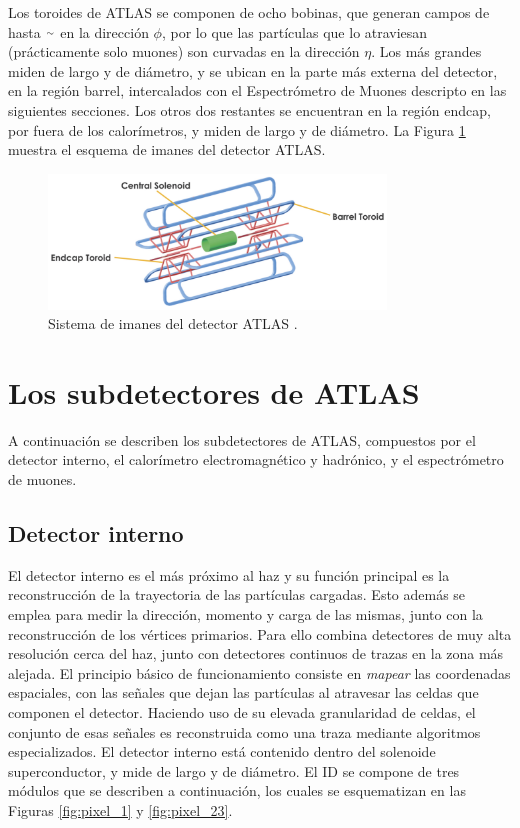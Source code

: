 Los toroides de ATLAS se componen de ocho bobinas, que generan campos de hasta {$\smallsim$} en la dirección $\phi$, por lo que las partículas que lo atraviesan (prácticamente solo muones) son curvadas en la dirección $\eta$. Los más grandes miden  de largo y  de diámetro, y se ubican en la parte más externa del detector, en la región barrel, intercalados con el Espectrómetro de Muones descripto en las siguientes secciones. Los otros dos restantes se encuentran en la región endcap, por fuera de los calorímetros, y miden  de largo y  de diámetro. La Figura \ref{fig:magnet_1} muestra el esquema de imanes del detector ATLAS.

\begin{figure}
\centering
  \includegraphics[width=0.8\textwidth]{images/lhc/magnet_1.png}
  \caption{Sistema de imanes del detector ATLAS \cite{magnet_system}.}
  \label{fig:magnet_1}
\end{figure}


\section{Los subdetectores de ATLAS}

A continuación se describen los subdetectores de ATLAS, compuestos por el detector interno, el calorímetro electromagnético y hadrónico, y el espectrómetro de muones.

\subsection{Detector interno}

El detector interno es el más próximo al haz y su función principal es la reconstrucción de la trayectoria de las partículas cargadas. Esto además se emplea para medir la dirección, momento y carga de las mismas, junto con la reconstrucción de los vértices primarios. Para ello combina detectores de muy alta resolución cerca del haz, junto con detectores continuos de trazas en la zona más alejada. 
El principio básico de funcionamiento consiste en \textit{mapear} las coordenadas espaciales, con las señales que dejan las partículas al atravesar las celdas que componen el detector. 
Haciendo uso de su elevada granularidad de celdas, el conjunto de esas señales es reconstruida como una traza mediante algoritmos especializados. 
El detector interno está contenido dentro del solenoide superconductor, y mide  de largo y  de diámetro. El ID se compone de tres módulos que se describen a continuación, los cuales se esquematizan en las Figuras \ref{fig:pixel_1} y \ref{fig:pixel_23}.

